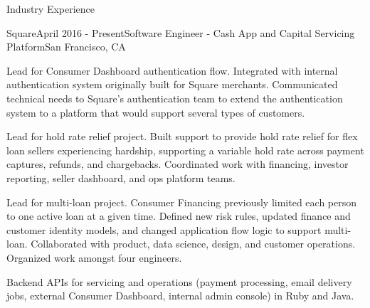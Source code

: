 \documentclass{resume} %
\begin{document}
\begin{rSection}{Industry Experience}

\begin{rSubsection}{Square}{April 2016 - Present}{Software Engineer - Cash App and Capital Servicing Platform}{San Francisco, CA}

\item Lead for Consumer Dashboard authentication flow. Integrated with internal authentication system originally built for Square merchants. Communicated technical needs to Square's authentication team to extend the authentication system to a platform that would support several types of customers.
\item Lead for hold rate relief project. Built support to provide hold rate relief for flex loan sellers experiencing hardship, supporting a variable hold rate across payment captures, refunds, and chargebacks. Coordinated work with financing, investor reporting, seller dashboard, and ops platform teams.
\item Lead for multi-loan project. Consumer Financing previously limited each person to one active loan at a given time. Defined new risk rules, updated finance and customer identity models, and changed application flow logic to support multi-loan. Collaborated with product, data science, design, and customer operations. Organized work amongst four engineers.
\item Backend APIs for servicing and operations (payment processing, email delivery jobs, external Consumer Dashboard, internal admin console) in Ruby and Java.

\end{rSubsection}


%
%


\end{rSection}
\end{document}
